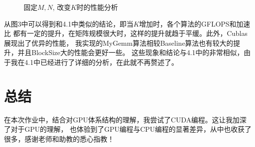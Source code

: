\documentclass[UTF8]{article}
\begin{document}
\begin{figure}[htbp]
    \centering
    \centering
    \caption{固定$M, N$, 改变$K$时的性能分析}
    \end{figure}
从图3中可以得到和4.1中类似的结论，即当$K$增加时，各个算法的GFLOPS和加速比
都有一定的提升，在矩阵规模很大时，这样的提升就趋于平缓。此外，Cublas展现出了优异的性能，
我实现的MyGemm算法相较Baseline算法也有较大的提升，并且BlockSize大的性能会更好一些。
这些现象和结论与4.1中的非常相似，由于我在4.1中已经进行了详细的分析，在此就不再赘述了。


\section{总结}
在本次作业中，结合对GPU体系结构的理解，我尝试了CUDA编程。这让我加深了对于GPU的理解，
也体验到了GPU编程与CPU编程的显著差异，从中也收获了很多，感谢老师和助教的悉心指教！


\end{document}
